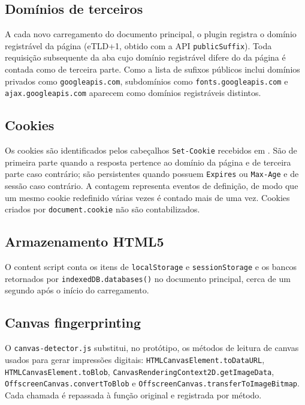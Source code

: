 \documentclass[11pt,a4paper]{article}
\begin{document}
\subsection{Domínios de terceiros}

A cada novo carregamento do documento principal, o plugin registra o domínio registrável da página (eTLD+1, obtido com a API \texttt{publicSuffix}). Toda requisição subsequente da aba cujo domínio registrável difere do da página é contada como de terceira parte. Como a lista de sufixos públicos inclui domínios privados como \texttt{googleapis.\allowbreak{}com}, subdomínios como \texttt{fonts.\allowbreak{}googleapis.\allowbreak{}com} e \texttt{ajax.\allowbreak{}googleapis.\allowbreak{}com} aparecem como domínios registráveis distintos.

\subsection{Cookies}

Os cookies são identificados pelos cabeçalhos \texttt{Set-Cookie} recebidos em . São de primeira parte quando a resposta pertence ao domínio da página e de terceira parte caso contrário; são persistentes quando possuem \texttt{Expires} ou \texttt{Max-Age} e de sessão caso contrário. A contagem representa eventos de definição, de modo que um mesmo cookie redefinido várias vezes é contado mais de uma vez. Cookies criados por \texttt{document.\allowbreak{}cookie} não são contabilizados.

\subsection{Armazenamento HTML5}

O content script conta os itens de \texttt{localStorage} e \texttt{sessionStorage} e os bancos retornados por \texttt{indexedDB.\allowbreak{}databases()} no documento principal, cerca de um segundo após o início do carregamento.

\subsection{Canvas fingerprinting}

O \texttt{canvas-detector.\allowbreak{}js} substitui, no protótipo, os métodos de leitura de canvas usados para gerar impressões digitais: \texttt{HTMLCanvasElement.\allowbreak{}toDataURL}, \texttt{HTMLCanvasElement.\allowbreak{}toBlob}, \texttt{CanvasRenderingContext2D.\allowbreak{}getImageData}, \texttt{OffscreenCanvas.\allowbreak{}convertToBlob} e \texttt{OffscreenCanvas.\allowbreak{}transferToImageBitmap}. Cada chamada é repassada à função original e registrada por método.
\end{document}

